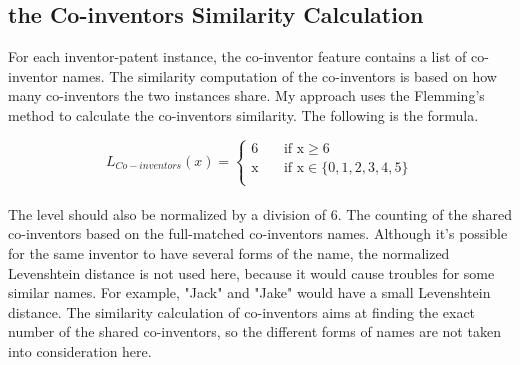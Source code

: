 \subsection{the Co-inventors Similarity Calculation}
For each inventor-patent instance, the co-inventor feature contains a list of co-inventor names. The similarity computation of the co-inventors is based on how many co-inventors the two instances share. My approach uses the Flemming's method to calculate the co-inventors similarity. The following is the formula.

\[   
L_{Co-inventors}(x) = 
     \begin{cases}
       \text{6} &\quad\text{if x}\ge6\\
       \text{x} &\quad\text{if x} \in \{0,1,2,3,4,5\} \\
     \end{cases}
\]
\\

The level should also be normalized by a division of 6. The counting of the shared co-inventors based on the full-matched co-inventors names. Although it's possible for the same inventor to have several forms of the name, the normalized Levenshtein distance is not used here, because it would cause troubles for some similar names. For example, "Jack" and "Jake" would have a small Levenshtein distance. The similarity calculation of co-inventors aims at finding the exact number of the shared co-inventors,  so the different forms of names are not taken into consideration here.

